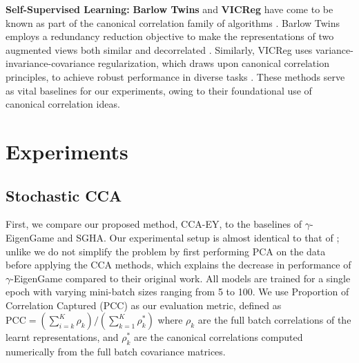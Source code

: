 \textbf{Self-Supervised Learning:}
\textbf{Barlow Twins} and \textbf{VICReg} have come to be known as part of the canonical correlation family of algorithms \citep{balestriero2023cookbook}. Barlow Twins employs a redundancy reduction objective to make the representations of two augmented views both similar and decorrelated \citep{zbontar2021barlow}. Similarly, VICReg uses variance-invariance-covariance regularization, which draws upon canonical correlation principles, to achieve robust performance in diverse tasks \citep{bardes2021vicreg}. These methods serve as vital baselines for our experiments, owing to their foundational use of canonical correlation ideas.

\section{Experiments}\label{Experiments}

\subsection{Stochastic CCA}
First, we compare our proposed method, CCA-EY, to the baselines of $\gamma$-EigenGame and SGHA.
Our experimental setup is almost identical to that of \cite{meng2021online, gemp2022generalized}; unlike \cite{gemp2022generalized} we do not simplify the problem by first performing PCA on the data before applying the CCA methods, which explains the decrease in performance of $\gamma$-EigenGame compared to their original work.
All models are trained for a single epoch with varying mini-batch sizes ranging from 5 to 100. We use Proportion of Correlation Captured (PCC) as our evaluation metric, defined as \( \text{PCC} = (\sum_{i=k}^K \rho_k)/ ({\sum_{k=1}^K \rho_k^*}) \) where $\rho_k$ are the full batch correlations of the learnt representations, and $\rho_k^*$ are the canonical correlations computed numerically from the full batch covariance matrices.


